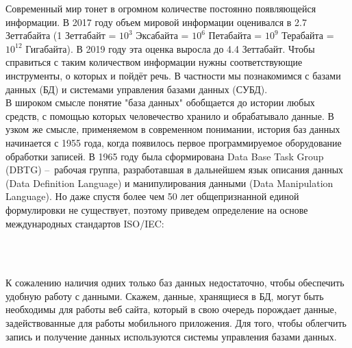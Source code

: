 
\graphicspath{ {imgs/} }




Современный мир тонет в огромном количестве постоянно появляющейся информации. В 2017 году объем мировой информации оценивался в 2.7 Зеттабайта (1 Зеттабайт = $10^3$ Эксабайта = $10^6$ Петабайта = $10^9$ Терабайта = $10^{12}$ Гигабайта). В 2019 году эта оценка выросла до 4.4 Зеттабайт. Чтобы справиться с таким количеством информации нужны соответствующие инструменты, о которых и пойдёт речь. В частности мы познакомимся с базами данных (БД) и системами управления базами данных (СУБД). \\

В широком смысле понятие "база данных" обобщается до истории любых средств, с помощью которых человечество хранило и обрабатывало данные. В узком же смысле, применяемом в современном понимании, история баз данных начинается с 1955 года, когда появилось первое программируемое оборудование обработки записей. В 1965 году была сформирована Data Base Task Group (DBTG) – рабочая группа, разработавшая в дальнейшем язык описания данных (Data Definition Language) и манипулирования данными (Data Manipulation Language). Но даже спустя более чем 50 лет общепризнанной единой формулировки не существует, поэтому приведем определение на основе международных стандартов ISO/IEC: \\

\

\

К сожалению наличия одних только баз данных недостаточно, чтобы обеспечить удобную работу с данными. Скажем, данные, хранящиеся в БД, могут быть необходимы для работы веб сайта, который в свою очередь порождает данные, задействованные для работы мобильного приложения. Для того, чтобы облегчить запись и получение данных используются системы управления базами данных. \\

\

